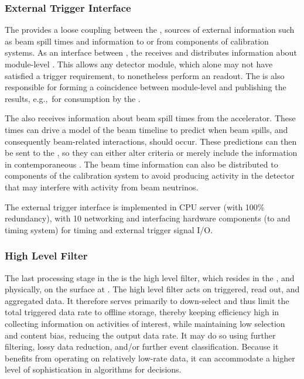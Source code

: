\subsubsection{External Trigger Interface}

The  provides a loose coupling between the
, sources of external information such as beam spill times
and information to or from components of  
calibration systems. As an interface between , the  receives and distributes information about module-level  .
This allows any detector module, which alone may not have satisfied a  trigger requirement, to nonetheless perform an  readout.
The  is also responsible for forming a coincidence between module-level   and publishing the results, e.g.,~for consumption by the .

The  also receives information about beam spill times from the accelerator.
These times can drive a model of the beam timeline to predict when
beam spills, and consequently beam-related interactions, should occur. 
These predictions can then be sent to the , so they
can either alter  criteria or merely include the
information in contemporaneous . The beam time information can also be distributed to components of the calibration system to avoid producing activity in the detector that may interfere with activity from beam neutrinos.

The external trigger interface is implemented in  CPU server (with 100\%
redundancy), with \SI{10}{\Gbps} networking and interfacing hardware
components (to  and  timing system) for timing and external trigger signal I/O.

\subsubsection{High Level Filter}
\label{sec:daq:design-data-reduction}

The last processing stage in the  is the
high level filter, which resides in the , and physically,
on the surface at .
The high level filter acts on triggered, read out, and aggregated data. 
It therefore serves primarily to down-select and thus
limit the total triggered data rate to offline storage, thereby keeping 
efficiency high in collecting information on activities of interest,
while maintaining low selection and content bias, reducing the output data
rate. It may do so using 
further filtering, lossy data reduction, and/or further event
classification.
Because it benefits from operating on relatively low-rate data, it can accommodate a higher level of
sophistication in algorithms for  decisions.

